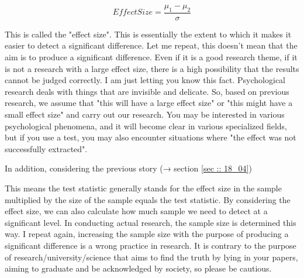 \documentclass{ltjsarticle}
\begin{document}
{\[ EffectSize =  \frac{\mu_1-\mu_2}{\sigma} \]

This is called the "effect size". This is essentially the extent to which it makes it easier to detect a significant difference. Let me repeat, this doesn't mean that the aim is to produce a significant difference. Even if it is a good research theme, if it is not a research with a large effect size, there is a high possibility that the results cannot be judged correctly. I am just letting you know this fact. Psychological research deals with things that are invisible and delicate. So, based on previous research, we assume that "this will have a large effect size" or "this might have a small effect size" and carry out our research. You may be interested in various psychological phenomena, and it will become clear in various specialized fields, but if you use a test, you may also encounter situations where "the effect was not successfully extracted".

In addition, considering the previous story (→ section \ref{sec :: 18_04})

This means the test statistic generally stands for the effect size in the sample multiplied by the size of the sample equals the test statistic. By considering the effect size, we can also calculate how much sample we need to detect at a significant level. In conducting actual research, the sample size is determined this way. I repeat again, increasing the sample size with the purpose of producing a significant difference is a wrong practice in research. It is contrary to the purpose of research/university/science that aims to find the truth by lying in your papers, aiming to graduate and be acknowledged by society, so please be cautious.

}
\end{document}
